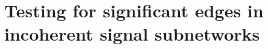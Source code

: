 \section{Testing for significant edges in incoherent signal subnetworks}
\label{sec:ch9:ssn_incoherent}